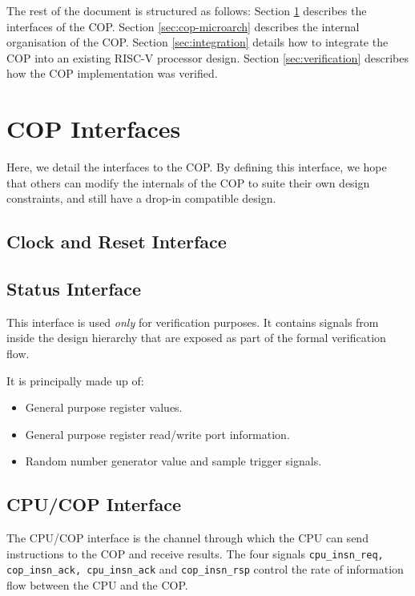 \documentclass{scarv-report}
\begin{document}
The rest of the document is structured as follows: Section 
\ref{sec:cop-interfaces} describes the interfaces of the COP. Section
\ref{sec:cop-microarch} describes the internal organisation of the COP.
Section \ref{sec:integration} details how to integrate the COP into an
existing RISC-V processor design. Section \ref{sec:verification} describes
how the COP implementation was verified.

\section{COP Interfaces}
\label{sec:cop-interfaces}

Here, we detail the interfaces to the COP. By defining this interface, we
hope that others can modify the internals of the COP to suite their own
design constraints, and still have a drop-in compatible design.

\subsection{Clock and Reset Interface}
\label{sec:if-clk-reset}


\subsection{Status Interface}

This interface is used {\em only} for verification purposes. It contains
signals from inside the design hierarchy that are exposed as part of the
formal verification flow.

It is principally made up of:

\begin{itemize}
\item General purpose register values.
\item General purpose register read/write port information.
\item Random number generator value and sample trigger signals.
\end{itemize}

\subsection{CPU/COP Interface}
\label{sec:cpu-cop-if}

The CPU/COP interface is the channel through which the CPU can send
instructions to the COP and receive results.
The four signals
{\tt cpu\_insn\_req, cop\_insn\_ack, cpu\_insn\_ack} and
{\tt cop\_insn\_rsp}
control the rate of information flow between the CPU and the COP.
\end{document}
